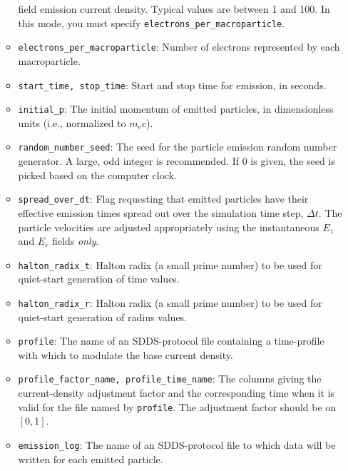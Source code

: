 \begin{itemize}
\begin{itemize}
        field emission current density.  Typical values are between 1 and 100.
        In this mode, you must specify {\tt electrons\_per\_macroparticle}.
    \item {\tt electrons\_per\_macroparticle}: Number of electrons represented by
        each macroparticle.  
    \item {\tt start\_time, stop\_time}: Start and stop time for emission, in seconds.
    \item {\tt initial\_p}:  The initial momentum of emitted
        particles, in dimensionless units (i.e., normalized to $m_e c$).
    \item {\tt random\_number\_seed}:  The seed for the particle emission random number
        generator.  A large, odd integer is recommended.  If 0 is given, the seed is picked based
        on the computer clock.
    \item {\tt spread\_over\_dt}: Flag requesting that emitted particles have their effective 
        emission times spread out over the simulation time step, $\Delta t$.  The particle velocities
        are adjusted appropriately using the instantaneous $E_z$ and $E_r$ fields {\em only}.
    \item {\tt halton\_radix\_t}: Halton radix (a small prime number) to be used for quiet-start
      generation of time values.
    \item {\tt halton\_radix\_r}: Halton radix (a small prime number) to be used for quiet-start
      generation of radius values.
    \item {\tt profile}: The name of an SDDS-protocol file containing a time-profile with which
        to modulate the base current density. 
    \item {\tt profile\_factor\_name, profile\_time\_name}: The columns giving the current-density
        adjustment factor and the corresponding time when it is valid for the file named by
        {\tt profile}.  The adjustment factor should be on $[0, 1]$.
    \item {\tt emission\_log}: The name of an SDDS-protocol file to which data will be written for
      each emitted particle.
\end{itemize}

\end{itemize}
